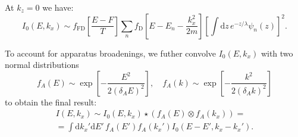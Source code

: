 \documentclass[10pt]{article}
\newcommand{\dd}{\mathrm{d}}
\begin{document}
At $k_z = 0$ we have:
\begin{equation}
	I_0(E, k_x) \sim f_{\mathrm{FD}}\left[ \frac{E - F}{T} \right] \sum_n
		f_{\mathrm{D}}\left[ E - E_n - \frac{k_x^2}{2m} \right]
		\left[ \int \dd z \, e^{- z / \lambda}
		\psi_n(z) \right]^2.
\end{equation}

To account for apparatus broadenings, we futher convolve $I_0(E, k_x)$ with
two normal distributions
\begin{equation}
	f_A(E) \sim \exp\left[ -\frac{E^2}{2(\delta_A E)^2} \right], \quad
	f_A(k) \sim \exp\left[ -\frac{k^2}{2(\delta_A k)^2} \right]
\end{equation}
to obtain the final result:
\begin{multline}
	I(E, k_x) \sim I_0(E, k_x) \star (f_A(E) \otimes f_A(k_x)) = \\
	= \int \dd k_x' \dd E' \, f_A(E') f_A(k_x') I_0(E - E', k_x - k_x').
\end{multline}



\end{document}
